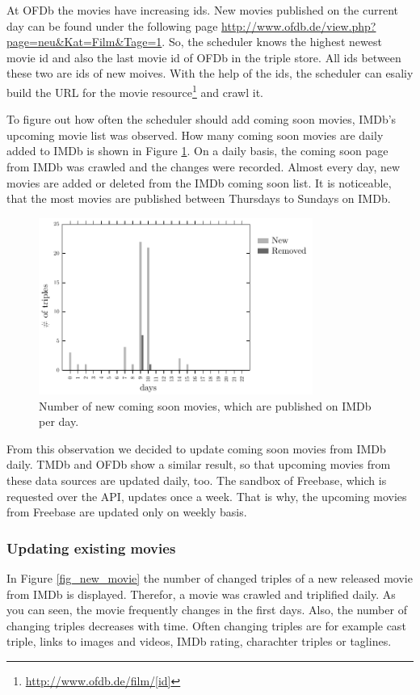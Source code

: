 At OFDb the movies have increasing ids.
New movies published on the current day can be found under the following page \url{http://www.ofdb.de/view.php?page=neu&Kat=Film&Tage=1}.
So, the scheduler knows the highest newest movie id and also the last movie id of OFDb in the triple store.
All ids between these two are ids of new moives.
With the help of the ids, the scheduler can esaliy build the URL for the movie resource\footnote{\url{http://www.ofdb.de/film/[id]}} and crawl it.

To figure out how often the scheduler should add coming soon movies, IMDb's upcoming movie list was observed.
How many coming soon movies are daily added to IMDb is shown in Figure \ref{fig_coming_soon_movie}.
On a daily basis, the coming soon page from IMDb was crawled and the changes were recorded.
Almost every day, new movies are added or deleted from the IMDb coming soon list.
It is noticeable, that the most movies are published between Thursdays to Sundays on IMDb.

\begin{figure}[h!]
  \begin{center}
  \includegraphics[width=0.8\textwidth]{images/updating_1.pdf}
  \end{center}
  \caption{Number of new coming soon movies, which are published on IMDb per day.}
  \label{fig_coming_soon_movie}
\end{figure}

From this observation we decided to update coming soon movies from IMDb daily.
TMDb and OFDb show a similar result, so that upcoming movies from these data sources are updated daily, too. The sandbox of Freebase, which is requested over the API, updates once a week. That is why, the upcoming movies from Freebase are updated only on weekly basis.

\subsubsection{Updating existing movies}
In Figure \ref{fig_new_movie} the number of changed triples of a new released movie from IMDb is displayed.
Therefor, a movie was crawled and triplified daily.
As you can seen, the movie frequently changes in the first days.
Also, the number of changing triples decreases with time.
Often changing triples are for example cast triple, links to images and videos, IMDb rating, charachter triples or taglines.

